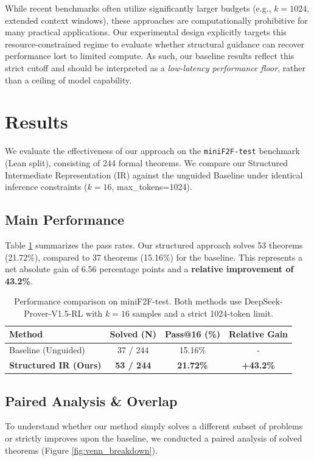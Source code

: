 \documentclass{article}
\begin{document}
While recent benchmarks often utilize significantly larger budgets (e.g., $k=1024$, extended context windows), these approaches are computationally prohibitive for many practical applications. Our experimental design explicitly targets this resource-constrained regime to evaluate whether structural guidance can recover performance lost to limited compute. As such, our baseline results reflect this strict cutoff and should be interpreted as a \textit{low-latency performance floor}, rather than a ceiling of model capability.


\section{Results}

We evaluate the effectiveness of our approach on the \texttt{miniF2F-test} benchmark (Lean split), consisting of 244 formal theorems. We compare our Structured Intermediate Representation (IR) against the unguided Baseline under identical inference constraints ($k=16$, max\_tokens=1024).

\subsection{Main Performance}
Table \ref{tab:main_results} summarizes the pass rates. Our structured approach solves 53 theorems (21.72\%), compared to 37 theorems (15.16\%) for the baseline. This represents a net absolute gain of 6.56 percentage points and a \textbf{relative improvement of 43.2\%}.

\begin{table}[h]
    \centering
    \begin{tabular}{lccc}
        \hline
        \textbf{Method} & \textbf{Solved (N)} & \textbf{Pass@16 (\%)} & \textbf{Relative Gain} \\
        \hline
        Baseline (Unguided) & 37 / 244 & 15.16\% & - \\
        \textbf{Structured IR (Ours)} & \textbf{53 / 244} & \textbf{21.72\%} & \textbf{+43.2\%} \\
        \hline
    \end{tabular}
    \caption{Performance comparison on miniF2F-test. Both methods use DeepSeek-Prover-V1.5-RL with $k=16$ samples and a strict 1024-token limit.}
    \label{tab:main_results}
\end{table}

\subsection{Paired Analysis \& Overlap}
To understand whether our method simply solves a different subset of problems or strictly improves upon the baseline, we conducted a paired analysis of solved theorems (Figure \ref{fig:venn_breakdown}).
\end{document}
